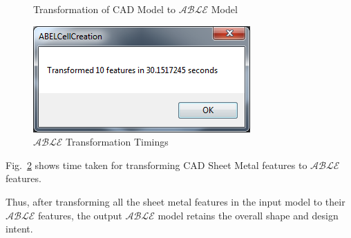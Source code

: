 \begin{figure}[!h]
\centering     %
{} \quad
{} \quad
\caption{Transformation of CAD Model to $\mathcal{ABLE}$ Model}
\label{fig:results:enlosureable}
\end{figure}


\begin{figure}[!h]
\centering     %
\includegraphics[width=0.6\linewidth,valign=t]{images/ABLEEnclosureTimings}
\caption{ $\mathcal{ABLE}$ Transformation Timings}
\label{fig:results:abletimings}
\end{figure}
Fig.~\ref{fig:results:abletimings} shows time taken for transforming CAD Sheet Metal features to  $\mathcal{ABLE}$ features.


Thus, after transforming all the sheet metal features in the input model to their $\mathcal{ABLE}$ features, the output $\mathcal{ABLE}$ model retains the overall shape and design intent.

